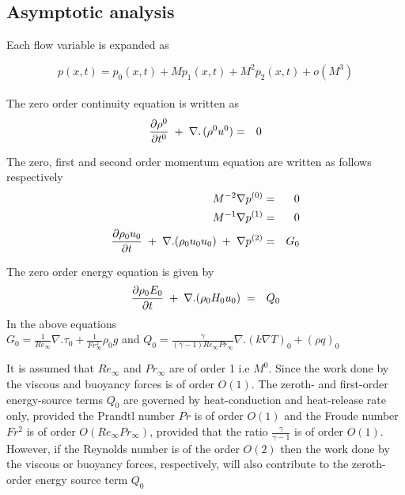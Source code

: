 \documentclass[11pt,a4paper]{article}
\begin{document}
\subsection{Asymptotic analysis}

Each flow variable is expanded as 

$$p(x,t)=p_0(x,t)+Mp_1(x,t)+M^2p_2(x,t)+o(M^3)$$ \\
The zero order continuity equation is written as 
\begin{eqnarray}
\frac{\partial \rho^0}{\partial t^0}\hspace{1mm}+\hspace{1mm}\nabla.\hspace{0.5mm}(\rho^0 u^0) &=& 0
\end{eqnarray}

The zero, first and second order momentum equation are written as follows respectively
\begin{eqnarray}
M^{-2}\nabla p^{(0)} &=& 0\\
M^{-1}\nabla p^{(1)} &=& 0\\
\frac{\partial\rho_0 u_0}{\partial t}\hspace{1mm}+\hspace{1mm}\nabla. (\rho_0 u_0 u_0) \hspace{1mm}+\hspace{1mm}\nabla p^{(2)} &=& G_0 
\end{eqnarray}

The zero order energy equation is given by
\begin{eqnarray}
\frac{\partial\rho_0 E_0}{\partial t}\hspace{1mm}+\hspace{1mm}\nabla. (\rho_0 H_0 u_0) \hspace{1mm}&=& Q_0
\end{eqnarray}
In the above equations \\
$G_0 = \frac{1}{Re_\infty} \nabla.\tau_0 + \frac{1}{Fr^2_\infty}\rho_0 g$ and
$Q_0 = \frac{\gamma}{(\gamma-1) Re_\infty Pr_\infty} \nabla. (k\nabla T)_0 + (\rho q)_0$

It is assumed that $Re_\infty$ and $Pr_\infty$ are of order 1 i.e $M^0$. Since the work done by the viscous and buoyancy forces is of order $O(1)$. The zeroth- and first-order energy-source terms $Q_0$ are governed by heat-conduction and heat-release rate only, provided the Prandtl number $Pr$ is of order $O(1)$ and the Froude number $Fr^2$ is of order $O(Re_\infty Pr_\infty)$, provided that the ratio $\frac{\gamma}{\gamma-1}$ is of order $O(1)$. However, if the Reynolds number
is of the order $O(2)$ then the work done by
the viscous or buoyancy forces, respectively, will also contribute to the zeroth-order energy
source term $Q_0$
\end{document}

